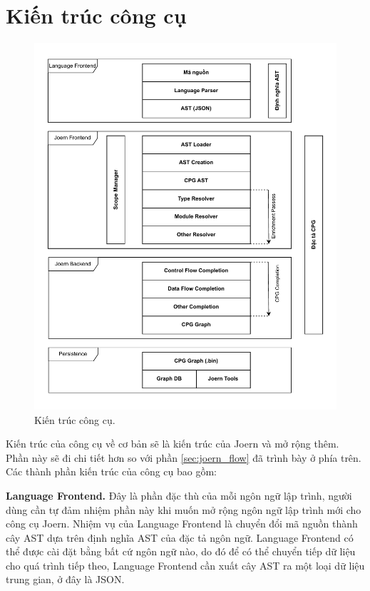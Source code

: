 \section{Kiến trúc công cụ}

\begin{figure}[H]
	\includegraphics[width=1\columnwidth]{figures/c3/c3_arch.drawio.pdf}
	\centering
	\caption{Kiến trúc công cụ.}
	\label{img:c3_arch}
\end{figure}

\newpage

Kiến trúc của công cụ về cơ bản sẽ là kiến trúc của Joern và mở rộng thêm.
Phần này sẽ đi chi tiết hơn so với phần \ref{sec:joern_flow} đã trình bày ở phía trên.
Các thành phần kiến trúc của công cụ bao gồm:

\textbf{Language Frontend.} Đây là phần đặc thù của mỗi ngôn ngữ lập trình, người dùng cần tự đảm nhiệm phần này khi muốn mở rộng ngôn ngữ lập trình mới cho công cụ Joern.
Nhiệm vụ của Language Frontend là chuyển đổi mã nguồn thành cây AST dựa trên định nghĩa AST của đặc tả ngôn ngữ.
Language Frontend có thể được cài đặt bằng bất cứ ngôn ngữ nào, do đó để có thể chuyển tiếp dữ liệu cho quá trình tiếp theo, Language Frontend cần xuất cây AST ra một loại dữ liệu trung gian, ở đây là JSON.

